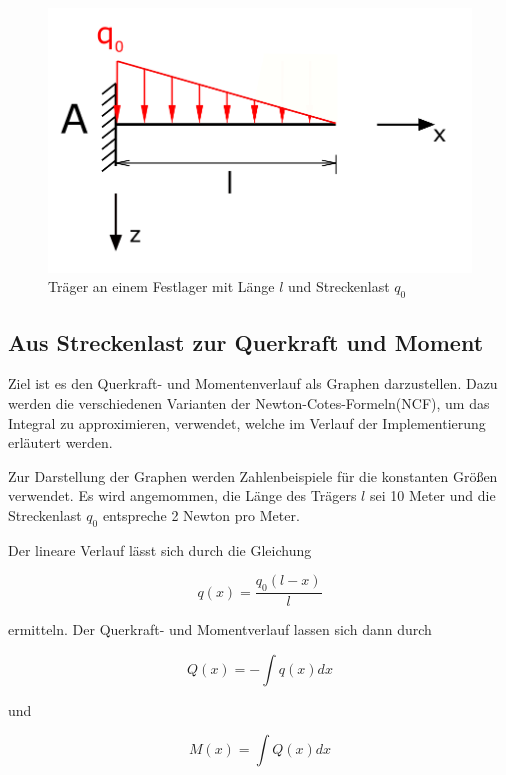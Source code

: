 \begin{figure}[h]
    \centering
    \includegraphics[scale = 0.5]{images/example_internal_force.png}
    \caption{Träger an einem Festlager mit Länge $l$ und Streckenlast $q_0$}
    \label{fig:ExampleInternalForce}
\end{figure}

\subsection{Aus Streckenlast zur Querkraft und Moment}
 Ziel ist es den Querkraft- und Momentenverlauf als Graphen darzustellen. Dazu werden die verschiedenen Varianten der Newton-Cotes-Formeln(NCF), um das Integral zu approximieren, verwendet, welche im Verlauf der Implementierung erläutert werden.

Zur Darstellung der Graphen werden Zahlenbeispiele für die konstanten Größen verwendet. Es wird angemommen, die Länge des Trägers $l$ sei 10 Meter und die Streckenlast $q_0$ entspreche 2 Newton pro Meter.

Der lineare Verlauf lässt sich durch die Gleichung

\begin{equation}
    \label{eq:Streckenlast}
    q(x) = \frac{q_0 (l - x)}{l}\tag{eq1}
\end{equation}

ermitteln. 
Der Querkraft- und Momentverlauf lassen sich dann durch

\begin{equation}
    \label{eq:Querkraft}
    Q(x) = - \int q(x) dx\tag{eq2}
\end{equation}

und

\begin{equation}
    \label{eq:Moment}
    M(x) = \int Q(x) dx\tag{eq3}
\end{equation}

